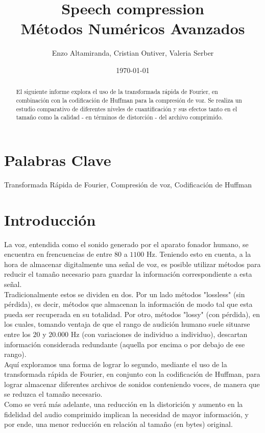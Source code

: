 \documentclass[a4paper,11pt]{article}
\title{Speech compression \\
M\'etodos Num\'ericos Avanzados}
\author{Enzo Altamiranda, Cristian Ontiver, Valeria Serber}
\date{\today}
\begin{document}
\maketitle
\thispagestyle{empty}
\vspace{3cm}

\renewcommand{\abstractname}{Resumen}
\begin{abstract}
El siguiente informe explora el uso de la transformada rápida de Fourier, en
combinación con la codificación de Huffman para la compresión de voz. Se
realiza un estudio comparativo de diferentes niveles de cuantificación y sus
efectos tanto en el tamaño como la calidad - en términos de distorción - del
archivo comprimido.
\end{abstract}
\section{Palabras Clave}
Transformada Rápida de Fourier, Compresión de voz, Codificación de Huffman
\newpage
\section{Introducci\'on}

La voz, entendida como el sonido generado por el aparato fonador humano, se
encuentra en frencuencias de entre $80$ a $1100$ Hz.  Teniendo esto en cuenta,
a la hora de almacenar digitalmente una señal de voz, es posible utilizar
métodos para reducir el tamaño necesario para guardar la información
correspondiente a esta señal.\\
Tradicionalmente estos se dividen en dos. Por un lado métodos "lossless" (sin
pérdida), es decir, métodos que almacenan la información de modo tal que esta
pueda ser recuperada en su totalidad. Por otro, métodos "lossy" (con pérdida),
en los cuales, tomando ventaja de que el rango de audición humano suele
situarse entre los $20$ y $20.000$ Hz (con variaciones de individuo a
individuo), descartan información considerada redundante (aquella por encima o
por debajo de ese rango).\\
Aquí exploramos una forma de lograr lo segundo, mediante el uso de la
transformada rápida de Fourier, en conjunto con la codificación de Huffman,
para lograr almacenar diferentes archivos de sonidos conteniendo voces, de
manera que se reduzca el tamaño necesario.\\
Como se verá más adelante, una reducción en la distorición y aumento en la
fidelidad del audio comprimido implican la necesidad de mayor información, y
por ende, una menor reducción en relación al tamaño (en bytes) original.
\newpage
\end{document}
